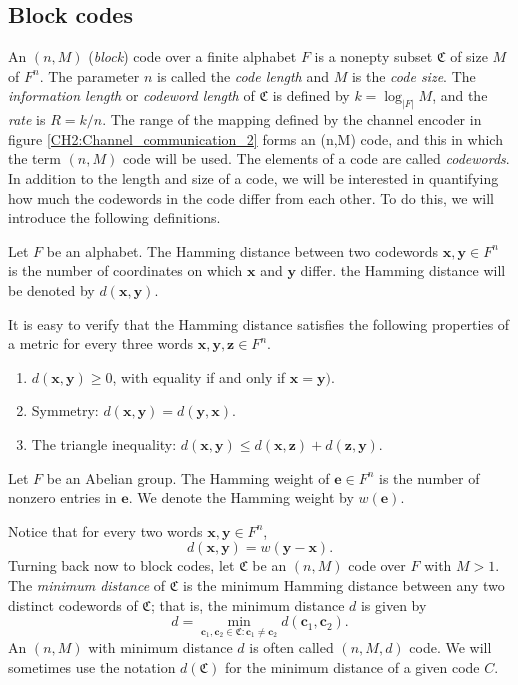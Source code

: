\subsection{Block codes}
An $(n,M)$ (\textit{block}) code over a finite alphabet $F$ is a nonepty subset $\mathfrak{C}$ of size $M$ of $F^n$. The parameter $n$ is called the \textit{code length} and $M$ is the \textit{code size}. The \textit{information length} or \textit{codeword length} of $\mathfrak{C}$ is defined by $k=\log_{|F|}M$, and the \textit{rate} is $R=k/n$. The range of the mapping defined by the channel encoder in figure \ref{CH2:Channel_communication_2} forms an (n,M) code, and this in which the term $(n,M)$ code will be used. The elements of a code are called \textit{codewords}.\\
\indent In addition to the length and size of a code, we will be interested in quantifying how much the codewords in the code differ from each other. To do this, we will introduce the following definitions.
\begin{definition}
Let $F$ be an alphabet. The Hamming distance between two codewords $\mathbf{x},\mathbf{y}\in F^n$ is the number of coordinates on which $\mathbf{x}$ and $\mathbf{y}$ differ. the Hamming distance will be denoted by $d(\mathbf{x},\mathbf{y})$.
\end{definition}
\indent It is easy to verify that the Hamming distance satisfies the following properties of a metric for every three words $\mathbf{x},\mathbf{y},\mathbf{z}\in F^n$.
\begin{enumerate}[label=(\roman*)]
\item $d(\mathbf{x},\mathbf{y})\geq 0$, with equality if and only if $\mathbf{x}=\mathbf{y})$.
\item Symmetry: $d(\mathbf{x},\mathbf{y})=d(\mathbf{y},\mathbf{x})$.
\item The triangle inequality: $d(\mathbf{x},\mathbf{y}) \leq d(\mathbf{x},\mathbf{z})+ d(\mathbf{z},\mathbf{y})$.
\end{enumerate}
\begin{definition}
Let $F$ be an Abelian group. The Hamming weight of $\mathbf{e}\in F^n$ is the number of nonzero entries in $\mathbf{e}$. We denote the Hamming weight by $w(\mathbf{e})$.
\end{definition}
\indent Notice that for every two words $\mathbf{x}, \mathbf{y}\in F^n$,
\begin{equation}
d(\mathbf{x},\mathbf{y}) = w(\mathbf{y}-\mathbf{x}).
\end{equation}
Turning back now to block codes, let $\mathfrak{C}$ be an $(n,M)$ code over $F$ with $M>1$. The \textit{minimum distance} of $\mathfrak{C}$ is the minimum Hamming distance between any two distinct codewords of $\mathfrak{C}$; that is, the minimum distance $d$ is given by
\begin{equation}
d=\min_{\mathbf{c}_1,\mathbf{c}_2\in \mathfrak{C} : \mathbf{c}_1\neq \mathbf{c}_2} d(\mathbf{c}_1,\mathbf{c}_2).
\end{equation}
An $(n,M)$ with minimum distance $d$ is often called $(n,M,d)$ code. We will sometimes use the notation $d(\mathfrak{C})$ for the minimum distance of a given code $C$.
